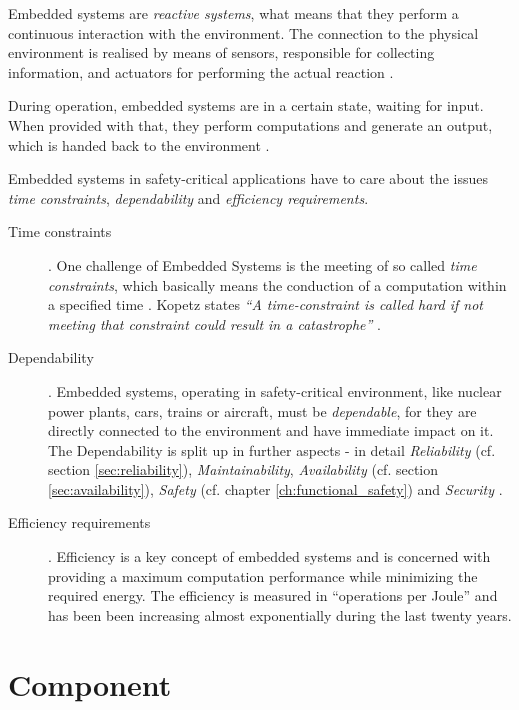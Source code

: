 Embedded systems are \emph{reactive systems}, what means that they perform a continuous interaction with the environment. The connection to the physical environment is realised by means of sensors, responsible for collecting information, and actuators for performing the actual reaction \cite[p.8-9]{marwedel}. 

During operation, embedded systems are in a certain state, waiting for input. When provided with that, they perform computations and generate an output, which is handed back to the environment \cite[p.9]{marwedel}.

Embedded systems in safety-critical applications have to care about the issues \emph{time constraints}, \emph{dependability} and \emph{efficiency requirements}.

\begin{description}
	\item [Time constraints].
	One challenge of Embedded Systems is the meeting of so called \emph{time constraints}, which basically means the conduction of a computation within a specified time \cite[p.8-9]{marwedel} \cite{rodrigues2011}. Kopetz states \emph{``A time-constraint is called hard if not meeting that constraint could result in a catastrophe''} \cite{kopetz}.
	\item [Dependability].
	Embedded systems, operating in safety-critical environment, like nuclear power plants, cars, trains or aircraft, must be \emph{dependable}, for they are directly connected to the environment and have immediate impact on it. The Dependability is split up in further aspects - in detail \emph{Reliability} (cf. section \ref{sec:reliability}), \emph{Maintainability}, \emph{Availability} (cf. section \ref{sec:availability}), \emph{Safety} (cf. chapter \ref{ch:functional_safety}) and \emph{Security} \cite[p.4-5]{marwedel}.
	\item [Efficiency requirements].
	Efficiency is a key concept of embedded systems and is concerned with providing a maximum computation performance while minimizing the required energy. The efficiency is measured in ``operations per Joule'' and has been been increasing almost exponentially during the last twenty years.
\end{description}






\section{Component}

